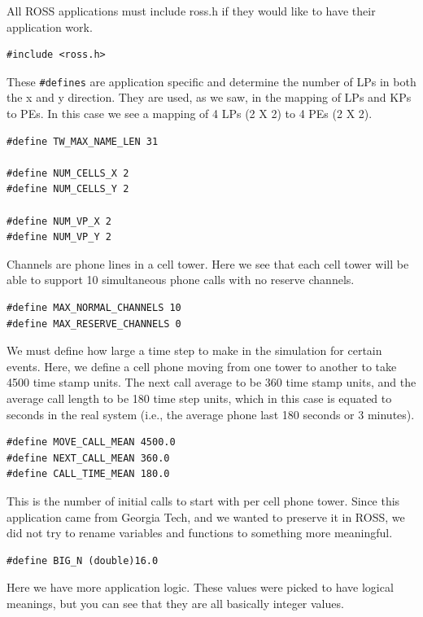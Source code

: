 \documentclass[12pt]{article}
\begin{document}
All ROSS applications must include ross.h if they would like to have their
application work.

\begin{verbatim}
#include <ross.h>
\end{verbatim}
 
These {\tt \#defines} are application specific and determine the number of LPs
in both the x and y direction.  They are used, as we saw, in the mapping of
LPs and KPs to PEs.  In this case we see a mapping of 4 LPs (2 X 2) to 4 PEs
(2 X 2).

\begin{verbatim}
#define TW_MAX_NAME_LEN 31

#define NUM_CELLS_X 2
#define NUM_CELLS_Y 2

#define NUM_VP_X 2               
#define NUM_VP_Y 2
\end{verbatim}
 
Channels are phone lines in a cell tower.  Here we see that each cell
tower will be able to support 10 simultaneous phone calls with no
reserve channels.

\begin{verbatim}
#define MAX_NORMAL_CHANNELS 10
#define MAX_RESERVE_CHANNELS 0
\end{verbatim}

We must define how large a time step to make in the simulation for
certain events.  Here, we define a cell phone moving from one tower to
another to take 4500 time stamp units.  The next call average to be
360 time stamp units, and the average call length to be 180 time step
units, which in this case is equated to seconds in the real system
(i.e., the average phone last 180 seconds or 3 minutes).

\begin{verbatim}
#define MOVE_CALL_MEAN 4500.0
#define NEXT_CALL_MEAN 360.0
#define CALL_TIME_MEAN 180.0
\end{verbatim}

This is the number of initial calls to start with per cell phone
tower.  Since this application came from Georgia Tech, and we wanted
to preserve it in ROSS, we did not try to rename variables and
functions to something more meaningful.

\begin{verbatim}
#define BIG_N (double)16.0
\end{verbatim}

Here we have more application logic.  These values were picked to have
logical meanings, but you can see that they are all basically integer
values.
\end{document}
